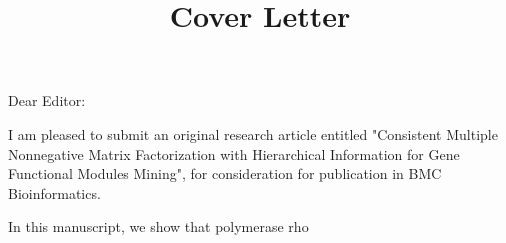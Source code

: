 \documentclass{article}
\begin{document}
\title{Cover Letter}
\date{}
\maketitle

Dear Editor:

I am pleased to submit an original research article entitled "Consistent Multiple Nonnegative Matrix Factorization with Hierarchical Information for Gene Functional Modules Mining", for consideration for publication in BMC Bioinformatics.

In this manuscript, we show that polymerase rho
\end{document}
